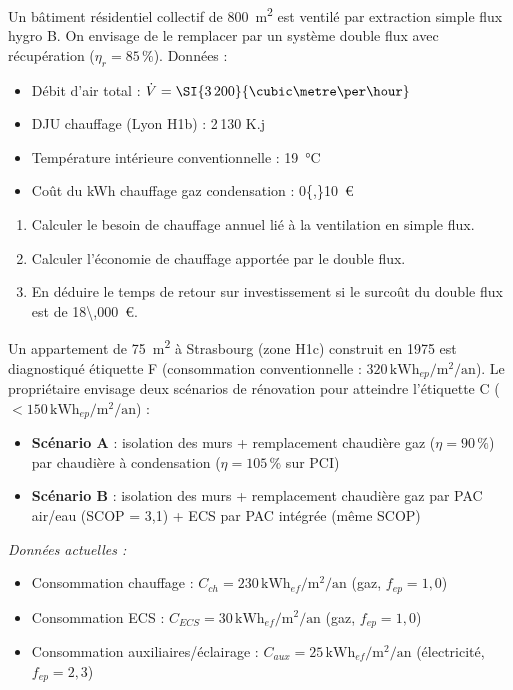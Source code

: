Un bâtiment résidentiel collectif de \SI{800}{\square\metre} est ventilé par extraction simple flux hygro B. On envisage de le remplacer par un système double flux avec récupération ($\eta_r = 85\,\%$). Données :
\begin{itemize}
  \item Débit d'air total : $\dot{V} = \SI{3\,200}{\cubic\metre\per\hour}$
  \item DJU chauffage (Lyon H1b) : 2\,130 K.j
  \item Température intérieure conventionnelle : \SI{19}{\degreeCelsius}
  \item Coût du kWh chauffage gaz condensation : \SI{0{,}10}{\euro}
\end{itemize}

\begin{enumerate}
  \item Calculer le besoin de chauffage annuel lié à la ventilation en simple flux.
  \item Calculer l'économie de chauffage apportée par le double flux.
  \item En déduire le temps de retour sur investissement si le surcoût du double flux est de \SI{18\,000}{\euro}.
\end{enumerate}



Un appartement de \SI{75}{\square\metre} à Strasbourg (zone H1c) construit en 1975 est diagnostiqué étiquette F (consommation conventionnelle : $320\,\text{kWh}_{ep}/\text{m}^2/\text{an}$). Le propriétaire envisage deux scénarios de rénovation pour atteindre l'étiquette C ($< 150\,\text{kWh}_{ep}/\text{m}^2/\text{an}$) :
\begin{itemize}
  \item \textbf{Scénario A} : isolation des murs + remplacement chaudière gaz ($\eta = 90\,\%$) par chaudière à condensation ($\eta = 105\,\%$ sur PCI)
  \item \textbf{Scénario B} : isolation des murs + remplacement chaudière gaz par PAC air/eau (SCOP = 3,1) + ECS par PAC intégrée (même SCOP)
\end{itemize}

\textit{Données actuelles :}
\begin{itemize}
  \item Consommation chauffage : $C_{ch} = 230\,\text{kWh}_{ef}/\text{m}^2/\text{an}$ (gaz, $f_{ep} = 1{,}0$)
  \item Consommation ECS : $C_{ECS} = 30\,\text{kWh}_{ef}/\text{m}^2/\text{an}$ (gaz, $f_{ep} = 1{,}0$)
  \item Consommation auxiliaires/éclairage : $C_{aux} = 25\,\text{kWh}_{ef}/\text{m}^2/\text{an}$ (électricité, $f_{ep} = 2{,}3$)
\end{itemize}

